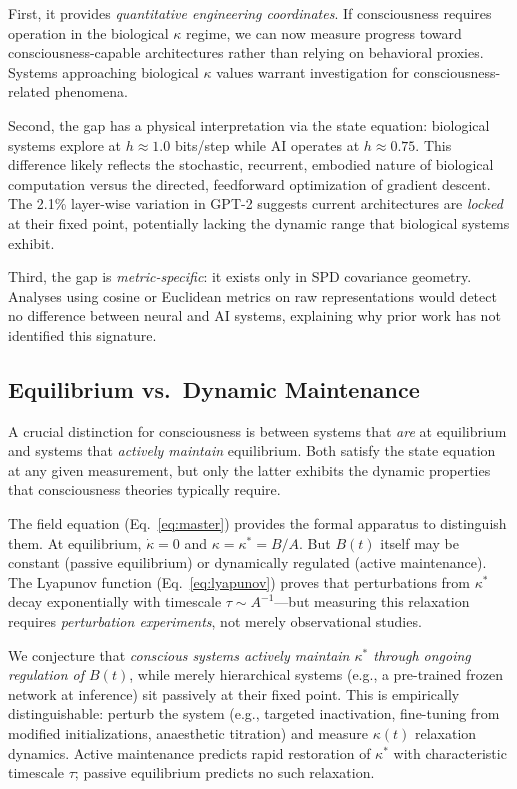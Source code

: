 \documentclass[letterpaper]{article}
\begin{document}
First, it provides \emph{quantitative engineering
coordinates}.
If consciousness requires operation in the
biological $\kappa$ regime, we can now measure
progress toward consciousness-capable architectures
rather than relying on behavioral proxies.
Systems approaching biological $\kappa$ values
warrant investigation for consciousness-related
phenomena.

Second, the gap has a physical interpretation via the
state equation: biological systems explore at
$h\approx1.0$ bits/step while AI operates at
$h\approx0.75$.
This difference likely reflects the stochastic,
recurrent, embodied nature of biological computation
versus the directed, feedforward optimization of
gradient descent.
The 2.1\% layer-wise variation in GPT-2 suggests
current architectures are \emph{locked} at their
fixed point, potentially lacking the dynamic range
that biological systems exhibit.

Third, the gap is \emph{metric-specific}: it exists
only in SPD covariance geometry.
Analyses using cosine or Euclidean metrics on raw
representations would detect no difference between
neural and AI systems, explaining why prior work has
not identified this signature.

\subsection{Equilibrium vs.\ Dynamic Maintenance}

A crucial distinction for consciousness is between
systems that \emph{are} at equilibrium and systems that
\emph{actively maintain} equilibrium.
Both satisfy the state equation at any given
measurement, but only the latter exhibits the
dynamic properties that consciousness theories
typically require.

The field equation (Eq.~\ref{eq:master}) provides the
formal apparatus to distinguish them.
At equilibrium, $\dot{\kappa}=0$ and
$\kappa=\kappa^*=B/A$.
But $B(t)$ itself may be constant (passive
equilibrium) or dynamically regulated
(active maintenance).
The Lyapunov function (Eq.~\ref{eq:lyapunov}) proves
that perturbations from $\kappa^*$ decay exponentially
with timescale $\tau\sim A^{-1}$---but measuring
this relaxation requires \emph{perturbation
experiments}, not merely observational studies.

We conjecture that \emph{conscious systems actively
maintain $\kappa^*$ through ongoing regulation of
$B(t)$}, while merely hierarchical systems
(e.g., a pre-trained frozen network at inference)
sit passively at their fixed point.
This is empirically distinguishable: perturb the
system (e.g., targeted inactivation, fine-tuning
from modified initializations, anaesthetic
titration) and measure $\kappa(t)$ relaxation
dynamics.
Active maintenance predicts rapid restoration of
$\kappa^*$ with characteristic timescale $\tau$;
passive equilibrium predicts no such relaxation.
\end{document}
